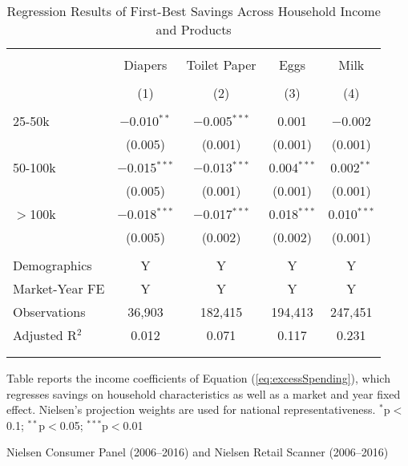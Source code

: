 
\begin{table}[!htbp] \centering
  \caption{Regression Results of First-Best Savings Across Household Income and Products}
  \label{tab:lowestPrice}
\begin{tabular}{@{\extracolsep{5pt}}lcccc}
\\[-1.8ex]\hline
\hline \\[-1.8ex]
 & Diapers & Toilet Paper & Eggs & Milk \\
\\[-1.8ex] & (1) & (2) & (3) & (4)\\
\hline \\[-1.8ex]
 25-50k & $-$0.010$^{**}$ & $-$0.005$^{***}$ & 0.001 & $-$0.002 \\
  & (0.005) & (0.001) & (0.001) & (0.001) \\
  50-100k & $-$0.015$^{***}$ & $-$0.013$^{***}$ & 0.004$^{***}$ & 0.002$^{**}$ \\
  & (0.005) & (0.001) & (0.001) & (0.001) \\
  $>$100k & $-$0.018$^{***}$ & $-$0.017$^{***}$ & 0.018$^{***}$ & 0.010$^{***}$ \\
  & (0.005) & (0.002) & (0.002) & (0.001) \\
 \hline \\[-1.8ex]
Demographics & Y & Y & Y & Y \\
Market-Year FE & Y & Y & Y & Y \\
Observations & 36,903 & 182,415 & 194,413 & 247,451 \\
Adjusted R$^{2}$ & 0.012 & 0.071 & 0.117 & 0.231 \\
\\[-1.8ex]\hline
\hline \\[-1.8ex]
\end{tabular}
\begin{tablenotes}
Table reports the income coefficients of Equation (\ref{eq:excessSpending}), which regresses savings on household characteristics as well as a market and year fixed effect. Nielsen's projection weights are used for national representativeness. $^{*}$p$<$0.1; $^{**}$p$<$0.05; $^{***}$p$<$0.01
\end{tablenotes}
\begin{tablenotes}[Source]
Nielsen Consumer Panel (2006--2016) and Nielsen Retail Scanner (2006--2016)
\end{tablenotes}
\end{table}
